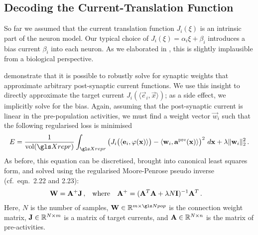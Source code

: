 \subsection{Decoding the Current-Translation Function}
\label{sec:nef_decode_current}

So far we assumed that the current translation function $J_i(\xi)$ is an intrinsic part of the neuron model.
Our typical choice of $J_i(\xi) = \alpha_i \xi + \beta_i$ introduces a bias current $\beta_i$ into each neuron.
As we elaborated in , this is slightly implausible from a biological perspective.

 demonstrate that it is possible to robustly solve for synaptic weights that approximate arbitrary post-synaptic current functions.
We use this insight to directly approximate the target current $J_i(\langle \vec e_i, \vec x \rangle)$; as a side effect, we implicitly solve for the bias.
Again, assuming that the post-synaptic current is linear in the pre-population activities, we must find a weight vector $\vec w_i$ such that the following regularised loss is minimised
\begin{align}
E = \frac{1}{\vol(\Xrepr)} \int_{\Xrepr} \left( J_i\bigl(\langle \vec e_i, \phi(\vec x)\rangle\bigr) - \langle \vec w_i, \vec a^\mathrm{pre}(\vec x) \rangle \right)^2 \, d\vec x + \lambda \| \vec w_i \|_\mathrm{2}^2\,.
\label{eqn:decode_current}
\end{align}
As before, this equation can be discretised, brought into canonical least squares form, and solved using the regularised Moore-Penrose pseudo inverse (cf.~eqn.~2.22 and 2.23):
\begin{align*}
	\mathbf{W} &= \mathbf{A}^+ \mathbf{J} \,, & \text{where} \quad \mathbf{A}^+ &= (\mathbf{A}^T \mathbf{A} + \lambda N \mathbf{I})^{-1} \mathbf{A}^T \,.
\end{align*}
Here, $N$ is the number of samples, $\mat W \in \mathbb{R}^{m \times \Npop}$ is the connection weight matrix, $\mathbf{J} \in \mathbb{R}^{N \times m}$ is a matrix of target currents, and $\mathbf{A} \in \mathbb{R}^{N \times n}$ is the matrix of pre-activities.

